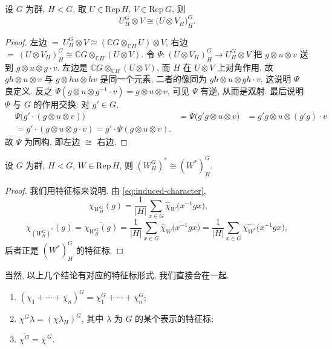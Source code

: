 \begin{lemma}[投影公式]\label{lem:projection-formula}
设 $G$ 为群, $H<G$, 取 $U\in\mathrm{Rep}\,H$, $V\in\mathrm{Rep}\,G$, 则
\[
  U_H^G\otimes V\cong\bigl(U\otimes V_H\bigr)_H^G .
\]
\end{lemma}

\begin{proof}
左边 $=\ U_H^G\otimes V\cong(\mathbb{C}G\otimes_{\mathbb{C}H}U)\otimes V$,
右边 $=\ (U\otimes V_H)_H^G\cong\mathbb{C}G\otimes_{\mathbb{C}H}(U\otimes V)$.
令 $\Psi\colon(U\otimes V_H)_H^G\to U_H^G\otimes V$ 把 $g\otimes u\otimes v$ 送到 $g\otimes u\otimes g\cdot v$.
左边是 $\mathbb{C}G\otimes_{\mathbb{C}H}(U\otimes V)$, 而 $H$ 在 $U\otimes V$ 上对角作用, 故
$gh\otimes u\otimes v$ 与 $g\otimes hu\otimes hv$ 是同一个元素, 二者的像同为 $gh\otimes u\otimes gh\cdot v$,
这说明 $\Psi$ 良定义. 反之 $\Psi(g\otimes u\otimes g^{-1}\cdot v)=g\otimes u\otimes v$, 可见 $\Psi$ 有逆,
从而是双射. 最后说明 $\Psi$ 与 $G$ 的作用交换: 对 $g'\in G$,
\[\begin{aligned}
  &\Psi\bigl(g'\cdot(g\otimes u\otimes v)\bigr)
  &=\Psi\bigl(g'g\otimes u\otimes v\bigr)
  &=g'g\otimes u\otimes (g'g)\cdot v\\
  &=g'\cdot(g\otimes u\otimes g\cdot v)=g'\cdot\Psi(g\otimes u\otimes v).
\end{aligned}\]
故 $\Psi$ 为同构, 即左边 $\cong$ 右边.
\end{proof}

\begin{proposition}\label{prop:dual-induction}
设 $G$ 为群, $H<G$, $W\in\mathrm{Rep}\,H$, 则 $(W_H^G)^*\cong(W^*)_H^G$.
\end{proposition}

\begin{proof}
我们用特征标来说明. 由 \eqref{eq:induced-character},
\[
  \chi_{W_H^G}(g)=\frac{1}{|H|}\sum_{x\in G}\widehat\chi_W\bigl(x^{-1}gx\bigr),
  \qquad
\]
\[
  \chi_{(W_H^G)^*}(g)=\overline{\chi_{W_H^G}(g)}
  =\frac{1}{|H|}\sum_{x\in G}\overline{\widehat\chi_W\bigl(x^{-1}gx\bigr)}
  =\frac{1}{|H|}\sum_{x\in G}\widehat{\chi_{W^*}}\bigl(x^{-1}gx\bigr),
\]
后者正是 $(W^*)_H^G$ 的特征标.
\end{proof}

当然, 以上几个结论有对应的特征标形式, 我们直接合在一起.

\begin{corollary}\label{cor:induced-character-properties}
\mbox{}\par\vspace{-0.2em}
\begin{enumerate}
  \item $(\chi_1+\cdots+\chi_n)^G=\chi_1^G+\cdots+\chi_n^G$;
  \item $\chi^G\lambda=(\chi\lambda_H)^G$, 其中 $\lambda$ 为 $G$ 的某个表示的特征标;
  \item $\overline{\chi^G}=\overline{\chi}^{\,G}$.
\end{enumerate}
\end{corollary}

